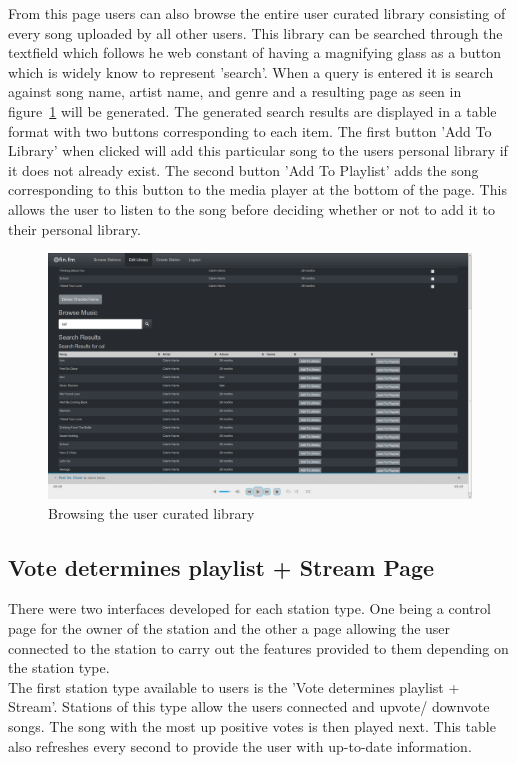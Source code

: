 \documentclass[a4paper, 12pt]{report}
\begin{document}
From this page users can also browse the entire user curated library consisting of every song uploaded by all other users. This library can be searched through the textfield which follows he web constant of having a magnifying glass as a button which is widely know to represent 'search'. When a query is entered it is search against song name, artist name, and genre and a resulting page as seen in figure~\ref{browse-library} will be generated.
The generated search results are displayed in a table format with two buttons corresponding to each item. The first button 'Add To Library' when clicked will add this particular song to the users personal library if it does not already exist. The second button 'Add To Playlist' adds the song corresponding to this button to the media player at the bottom of the page. This allows the user to listen to the song before deciding whether or not to add it to their personal library.   
\begin{figure}[H]
  \centering
    \includegraphics[width=1.0\textwidth]{screenshots/browse-library.png}
    \caption{Browsing the user curated library}
    \label{browse-library}
\end{figure}

\subsection{Vote determines playlist + Stream Page}
There were two interfaces developed for each station type. One being a control page for the owner of the station and the other a page allowing the user connected to the station to carry out the features provided to them depending on the station type. \\
The first station type available to users is the 'Vote determines playlist + Stream'. Stations of this type allow the users connected and upvote/ downvote songs. The song with the most up positive votes is then played next. This table also refreshes every second to provide the user with up-to-date information.\\
\end{document}
